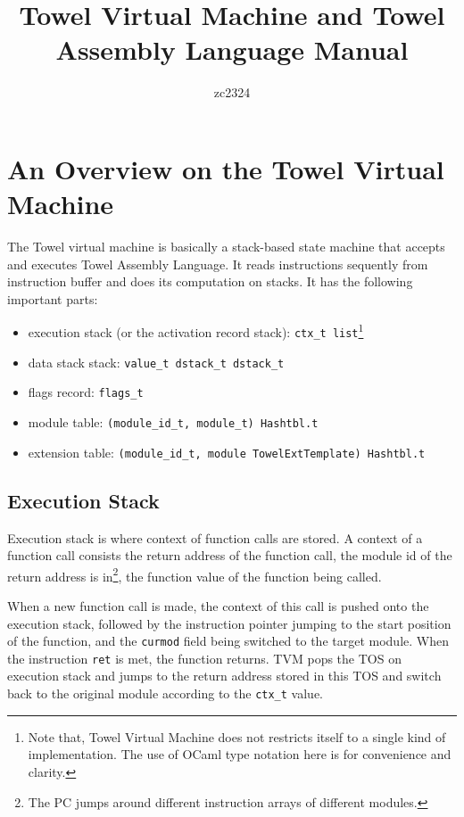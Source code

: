 \documentclass{article}
\title{Towel Virtual Machine and Towel Assembly Language Manual}
\author{zc2324}
\begin{document}
\maketitle
\tableofcontents

\section{An Overview on the Towel Virtual Machine}

The Towel virtual machine is basically a stack-based state machine that accepts and executes Towel Assembly Language. It reads instructions sequently from instruction buffer and does its computation on stacks. It has the following important parts:
\begin{itemize}
\item execution stack (or the activation record stack): \texttt{ctx\_t list}\footnote{Note that, Towel Virtual Machine does not restricts itself to a single kind of implementation. The use of OCaml type notation here is for convenience and clarity.}
\item data stack stack: \texttt{value\_t dstack\_t dstack\_t}
\item flags record: \texttt{flags\_t}
\item module table: \texttt{(module\_id\_t, module\_t) Hashtbl.t}
\item extension table: \texttt{(module\_id\_t, module TowelExtTemplate) Hashtbl.t}
\end{itemize}

\subsection{Execution Stack}

Execution stack is where context of function calls are stored. A context of a function call consists the return address of the function call, the module id of the return address is in\footnote{The PC jumps around different instruction arrays of different modules.}, the function value of the function being called.

When a new function call is made, the context of this call is pushed onto the execution stack, followed by the instruction pointer jumping to the start position of the function, and the \texttt{curmod} field being switched to the target module. When the instruction \texttt{ret} is met, the function returns. TVM pops the TOS on execution stack and jumps to the return address stored in this TOS and switch back to the original module according to the \texttt{ctx\_t} value.
\end{document}
